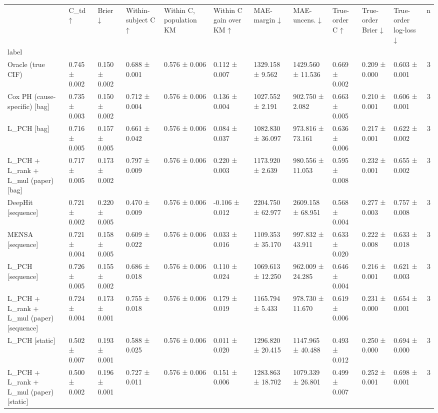 \begin{tabular}{lllllllllllr}
\toprule
 & C\_td ↑ & Brier ↓ & Within-subject C ↑ & Within C, population KM & Within C gain over KM ↑ & MAE-margin ↓ & MAE-uncens. ↓ & True-order C ↑ & True-order Brier ↓ & True-order log-loss ↓ & n \\
label &  &  &  &  &  &  &  &  &  &  &  \\
\midrule
Oracle (true CIF) & 0.745 ± 0.002 & 0.150 ± 0.002 & 0.688 ± 0.001 & 0.576 ± 0.006 & 0.112 ± 0.007 & 1329.158 ± 9.562 & 1429.560 ± 11.536 & 0.669 ± 0.002 & 0.209 ± 0.000 & 0.603 ± 0.001 & 3 \\
Cox PH (cause-specific) [bag] & 0.735 ± 0.003 & 0.150 ± 0.002 & 0.712 ± 0.004 & 0.576 ± 0.006 & 0.136 ± 0.004 & 1027.552 ± 2.191 & 902.750 ± 2.082 & 0.663 ± 0.005 & 0.210 ± 0.001 & 0.606 ± 0.001 & 3 \\
L\_PCH [bag] & 0.716 ± 0.005 & 0.157 ± 0.005 & 0.661 ± 0.042 & 0.576 ± 0.006 & 0.084 ± 0.037 & 1082.830 ± 36.097 & 973.816 ± 73.161 & 0.636 ± 0.006 & 0.217 ± 0.001 & 0.622 ± 0.002 & 3 \\
L\_PCH + L\_rank + L\_mul (paper) [bag] & 0.717 ± 0.005 & 0.173 ± 0.002 & 0.797 ± 0.009 & 0.576 ± 0.006 & 0.220 ± 0.003 & 1173.920 ± 2.639 & 980.556 ± 11.053 & 0.595 ± 0.008 & 0.232 ± 0.001 & 0.655 ± 0.002 & 3 \\
DeepHit [sequence] & 0.721 ± 0.002 & 0.220 ± 0.005 & 0.470 ± 0.009 & 0.576 ± 0.006 & -0.106 ± 0.012 & 2204.750 ± 62.977 & 2609.158 ± 68.951 & 0.568 ± 0.004 & 0.277 ± 0.003 & 0.757 ± 0.008 & 3 \\
MENSA [sequence] & 0.721 ± 0.004 & 0.158 ± 0.005 & 0.609 ± 0.022 & 0.576 ± 0.006 & 0.033 ± 0.016 & 1109.353 ± 35.170 & 997.832 ± 43.911 & 0.633 ± 0.020 & 0.222 ± 0.008 & 0.633 ± 0.018 & 3 \\
L\_PCH [sequence] & 0.726 ± 0.005 & 0.155 ± 0.002 & 0.686 ± 0.018 & 0.576 ± 0.006 & 0.110 ± 0.024 & 1069.613 ± 12.250 & 962.009 ± 24.285 & 0.646 ± 0.004 & 0.216 ± 0.001 & 0.621 ± 0.003 & 3 \\
L\_PCH + L\_rank + L\_mul (paper) [sequence] & 0.724 ± 0.004 & 0.173 ± 0.001 & 0.755 ± 0.018 & 0.576 ± 0.006 & 0.179 ± 0.019 & 1165.794 ± 5.433 & 978.730 ± 11.670 & 0.619 ± 0.006 & 0.231 ± 0.000 & 0.654 ± 0.001 & 3 \\
L\_PCH [static] & 0.502 ± 0.007 & 0.193 ± 0.001 & 0.588 ± 0.025 & 0.576 ± 0.006 & 0.011 ± 0.020 & 1296.820 ± 20.415 & 1147.965 ± 40.488 & 0.493 ± 0.012 & 0.250 ± 0.000 & 0.694 ± 0.000 & 3 \\
L\_PCH + L\_rank + L\_mul (paper) [static] & 0.500 ± 0.002 & 0.196 ± 0.001 & 0.727 ± 0.011 & 0.576 ± 0.006 & 0.151 ± 0.006 & 1283.863 ± 18.702 & 1079.339 ± 26.801 & 0.499 ± 0.007 & 0.252 ± 0.001 & 0.698 ± 0.001 & 3 \\
\bottomrule
\end{tabular}
